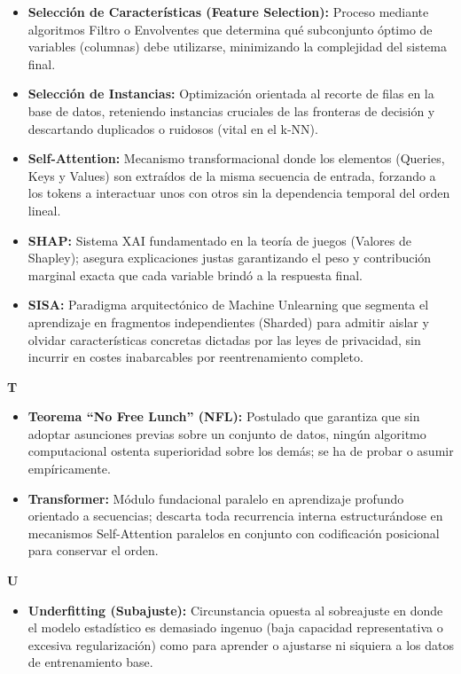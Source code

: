 \documentclass[12pt]{book} %
\providecommand{\tightlist}{%
  \setlength{\itemsep}{0pt}\setlength{\parskip}{0pt}}
\begin{document}
\begin{itemize}
\tightlist
\item
  \textbf{Selección de Características (Feature Selection):} Proceso
  mediante algoritmos Filtro o Envolventes que determina qué subconjunto
  óptimo de variables (columnas) debe utilizarse, minimizando la
  complejidad del sistema final.
\item
  \textbf{Selección de Instancias:} Optimización orientada al recorte de
  filas en la base de datos, reteniendo instancias cruciales de las
  fronteras de decisión y descartando duplicados o ruidosos (vital en el
  k‑NN).
\item
  \textbf{Self-Attention:} Mecanismo transformacional donde los
  elementos (Queries, Keys y Values) son extraídos de la misma secuencia
  de entrada, forzando a los tokens a interactuar unos con otros sin la
  dependencia temporal del orden lineal.
\item
  \textbf{SHAP:} Sistema XAI fundamentado en la teoría de juegos
  (Valores de Shapley); asegura explicaciones justas garantizando el
  peso y contribución marginal exacta que cada variable brindó a la
  respuesta final.
\item
  \textbf{SISA:} Paradigma arquitectónico de Machine Unlearning que
  segmenta el aprendizaje en fragmentos independientes (Sharded) para
  admitir aislar y olvidar características concretas dictadas por las
  leyes de privacidad, sin incurrir en costes inabarcables por
  reentrenamiento completo.
\end{itemize}

\textbf{T}

\begin{itemize}
\tightlist
\item
  \textbf{Teorema ``No Free Lunch'' (NFL):} Postulado que garantiza que
  sin adoptar asunciones previas sobre un conjunto de datos, ningún
  algoritmo computacional ostenta superioridad sobre los demás; se ha de
  probar o asumir empíricamente.
\item
  \textbf{Transformer:} Módulo fundacional paralelo en aprendizaje
  profundo orientado a secuencias; descarta toda recurrencia interna
  estructurándose en mecanismos Self-Attention paralelos en conjunto con
  codificación posicional para conservar el orden.
\end{itemize}

\textbf{U}

\begin{itemize}
\tightlist
\item
  \textbf{Underfitting (Subajuste):} Circunstancia opuesta al
  sobreajuste en donde el modelo estadístico es demasiado ingenuo (baja
  capacidad representativa o excesiva regularización) como para aprender
  o ajustarse ni siquiera a los datos de entrenamiento base.
\end{itemize}


\end{document}
